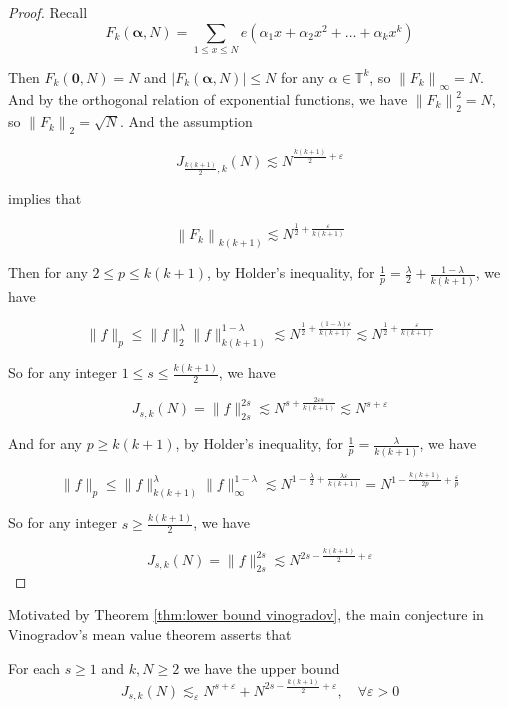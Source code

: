 \begin{proof}
    Recall
$$
F_{k}(\boldsymbol{\alpha},N)=\sum_{1 \leqslant x \leqslant N} e\left(\alpha_{1} x+\alpha_{2} x^{2}+\ldots+\alpha_{k} x^{k}\right)
$$

Then $F_{k}(\boldsymbol{0},N)=N$ and $\left|F_{k}(\boldsymbol{\alpha},N)\right| \leq N$ for any $\alpha \in \mathbb{T}^{k}$, so $\left\|F_{k}\right\|_{\infty}=N$. And by the orthogonal relation of exponential functions, we have $\left\|F_{k}\right\|_{2}^{2}=N$, so $\left\|F_{k}\right\|_{2}=\sqrt{N}$. And the assumption

$$
J_{\frac{k(k+1)}{2}, k}(N) \lesssim N^{\frac{k(k+1)}{2}+\varepsilon}
$$

implies that

$$
\left\|F_{k}\right\|_{k(k+1)} \lesssim N^{\frac{1}{2}+\frac{\varepsilon}{k(k+1)}}
$$

Then for any $2 \leq p \leq k(k+1)$, by Holder's inequality, for $\frac{1}{p}=\frac{\lambda}{2}+\frac{1-\lambda}{k(k+1)}$, we have

$$
\|f\|_{p} \leq\|f\|_{2}^{\lambda}\|f\|_{k(k+1)}^{1-\lambda} \lesssim N^{\frac{1}{2}+\frac{(1-\lambda) \varepsilon}{k(k+1)}} \lesssim N^{\frac{1}{2}+\frac{\varepsilon}{k(k+1)}}
$$

So for any integer $1 \leq s \leq \frac{k(k+1)}{2}$, we have

$$
J_{s, k}(N)=\|f\|_{2 s}^{2 s} \lesssim N^{s+\frac{2 \varepsilon s}{k(k+1)}} \lesssim N^{s+\varepsilon}
$$

And for any $p \geq k(k+1)$, by Holder's inequality, for $\frac{1}{p}=\frac{\lambda}{k(k+1)}$, we have

$$
\|f\|_{p} \leq\|f\|_{k(k+1)}^{\lambda}\|f\|_{\infty}^{1-\lambda} \lesssim N^{1-\frac{\lambda}{2}+\frac{\lambda \varepsilon}{k(k+1)}}=N^{1-\frac{k(k+1)}{2 p}+\frac{\varepsilon}{p}}
$$

So for any integer $s \geq \frac{k(k+1)}{2}$, we have

$$
J_{s, k}(N)=\|f\|_{2 s}^{2 s} \lesssim N^{2 s-\frac{k(k+1)}{2}+\varepsilon}
$$
\end{proof}
Motivated by Theorem \ref{thm:lower bound vinogradov}, the main conjecture in Vinogradov's mean value theorem asserts that
\begin{conj}
    For each $s \geq 1$ and $k, N \geq 2$ we have the upper bound
$$
J_{s, k}(N) \lesssim_{\varepsilon}N^{s+\varepsilon}+N^{2 s-\frac{k(k+1)}{2}+\varepsilon}, \quad \forall \varepsilon>0
$$
\end{conj}

